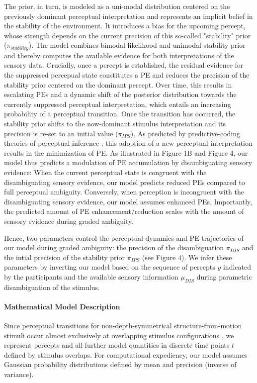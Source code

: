 \documentclass[12pt]{article}
\begin{document}
The prior, in turn, is modeled as a uni-modal distribution centered on the previously dominant perceptual interpretation and represents an implicit belief in the stability of the environment. It introduces a bias for the upcoming percept, whose strength depends on the current precision of this so-called "stability" prior ($\pi_{stability}$). The model combines bimodal likelihood and unimodal stability prior and thereby computes the available evidence for both interpretations of the sensory data. Crucially, once a percept is established, the residual evidence for the suppressed percepual state constitutes a PE and reduces the precision of the stability prior centered on the dominant percept. Over time, this results in escalating PEs and a dynamic shift of the posterior distribution towards the currently suppressed perceptual interpretation, which entails an increasing probability of a perceptual transition. Once the transition has occurred, the stability prior shifts to the now-dominant stimulus interpretation and its precision is re-set to an initial value ($\pi_{IPS}$). As predicted by predictive-coding theories of perceptual inference \parencite{Friston2005, Hohwy2008a}, this adoption of a new perceptual interpretation results in the minimization of PE. 
As illustrated in Figure 1B and Figure 4, our model thus predicts a modulation of PE accumulation by disambiguating sensory evidence: When the current perceptual state is congruent with the disambiguating sensory evidence, our model predicts reduced PEs compared to full perceptual ambiguity. Conversely, when perception is incongruent with the disambiguating sensory evidence, our model assumes enhanced PEs. Importantly, the predicted amount of PE enhancement/reduction scales with the amount of sensory evidence during graded ambiguity.

Hence, two parameters control the perceptual dynamics and PE trajectories of our model during graded ambiguity: the precision of the disambiguation $\pi_{DIS}$ and the intial precision of the stability prior $\pi_{IPS}$ (see Figure 4). We infer these parameters by inverting our model based on the sequence of percepts $y$ indicated by the participants and the available sensory information $\mu_{DIS}$ during parametric disambiguation of the stimulus. 

\paragraph{Mathematical Model Description}

Since perceptual transitions for non-depth-symmetrical structure-from-motion stimuli occur almost exclusively at overlapping stimulus configurations \parencite{Pastukhov2012a, Weilnhammer2013, Weilnhammer2014}, we represent percepts and all further model quantities in discrete time points $t$ defined by stimulus overlaps. For computational expediency, our model assumes Gaussian probability distributions defined by mean and precision (inverse of variance).
\end{document}
